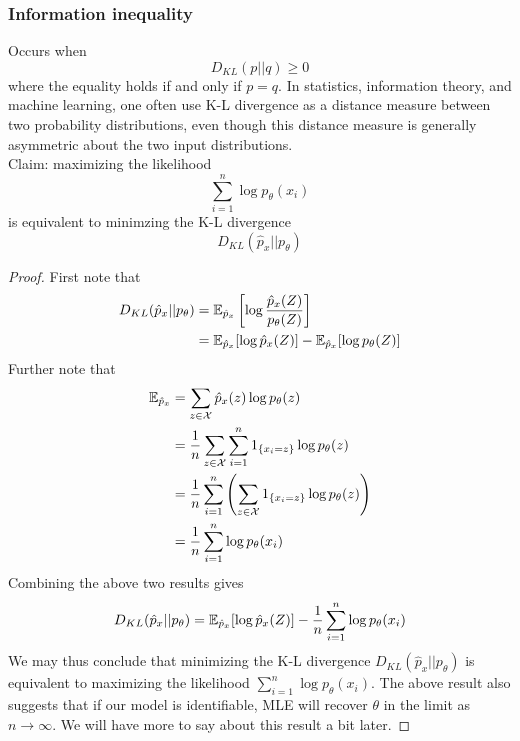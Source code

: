 \documentclass[11pt]{book}
\begin{document}
\subsubsection{Information inequality}
Occurs when 
\[
  D_{KL}(p || q) \geq 0 
\]
where the equality holds if and only if $p=q$. In statistics, information theory, and machine learning, one often use K-L divergence as a distance measure between two probability
distributions, even though this distance measure is generally asymmetric about the two input distributions. \\ 

\noindent Claim: maximizing the likelihood 
\[
  \sum_{i=1}^n \log p_\theta(x_i)
\] 
is equivalent to minimzing the K-L divergence 
\[
  D_{KL}(\hat{p}_x || p_\theta)
\]
\begin{proof}
  First note that 
  \begin{align*}
    D_{KL}(\hat{p}_x || p_\theta) &= \mathbb{E}_{\hat{p}_x} \left[ \log \frac{\hat{p}_x(Z)}{p_\theta(Z)}\right] \\ 
                                  &= \mathbb{E}_{\hat{p}_x} [\log\hat{p}_x(Z)] - \mathbb{E}_{\hat{p}_x}[\log p_\theta(Z)]
  \end{align*}
  Further note that 
  \begin{align*}
  \mathbb{E}_{\hat{p}_x} &= \sum_{z\in\mathcal{X}} \hat{p}_x(z)\log p_{\theta}(z) \\ 
                   &= \frac{1}{n} \sum_{z\in\mathcal{X}}\sum_{i=1}^n 1_{\{ x_i=z \}} \log p_\theta(z) \\ 
                   &= \frac{1}{n} \sum_{i=1}^n \left( \sum_{z\in\mathcal{X}} 1_{\{x_i=z\}} \log p_\theta(z) \right) \\ 
                   &= \frac{1}{n} \sum_{i=1}^n \log p_\theta(x_i)
  \end{align*}
  Combining the above two results gives 
  \[
    D_{KL}(\hat{p}_x || p_\theta) = \mathbb{E}_{\hat{p}_x}[\log \hat{p}_x (Z)] - \frac{1}{n} \sum_{i=1}^n \log p_\theta(x_i)
  \]
  We may thus conclude that minimizing the K-L divergence $D_{KL}(\hat{p}_x || p_\theta)$ is equivalent to 
  maximizing the likelihood $\sum_{i=1}^n \log p_\theta(x_i)$. The above result also suggests that if 
  our model is identifiable, MLE will recover $\theta$ in the limit as $n \to \infty$. We will have more 
  to say about this result a bit later.
\end{proof}
\end{document}
